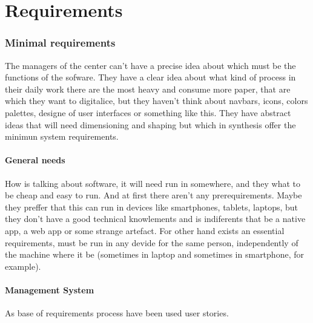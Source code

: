 \chapter{Requirements}



\subsection{Minimal requirements}

The managers of the center can't have a precise idea about which must be the functions of the sofware. They have a clear idea about what kind of process in their daily work there are the most heavy and consume more paper, that are which they want to digitalice, but they haven't think about navbars, icons, colors palettes, designe of user interfaces or something like this.  They have abstract ideas that will need dimensioning and shaping but which in synthesis offer the minimun system requirements.

\bigskip
\subsubsection{General needs}
\bigskip

How is talking about software, it will need run in somewhere, and they what to be cheap and easy to run. And at first there aren't any prerequirements. Maybe they preffer that this can run in devices like smartphones, tablets, laptops, but they don't have a good technical knowlements and is indiferents that be a native app, a web app or some strange artefact.
For other hand exists an essential requirements, must be run in any devide for the same person, independently of the machine where it be (sometimes in laptop and sometimes in smartphone, for example).

\bigskip
\subsubsection{Management System}
\bigskip


As base of requirements process have been used user stories.

\noindent{}

